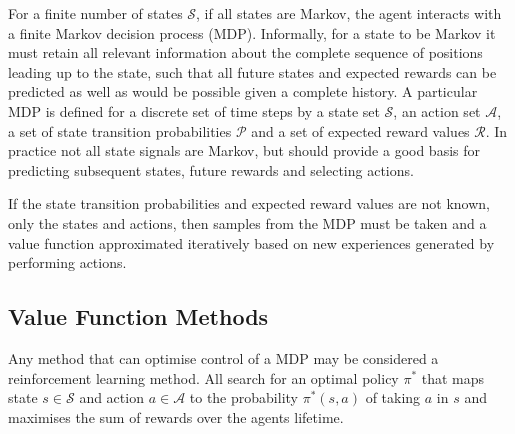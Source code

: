 %

For a finite number of states $\mathscr{S}$, if all states are Markov, the
agent interacts with a finite Markov decision process (MDP).  Informally,
for a state to be Markov it must retain all relevant information about the
complete sequence of positions leading up to the state, such that all future
states and expected rewards can be predicted as well as would be possible given
a complete history.  A particular MDP is defined for a discrete set of time
steps by a state set $\mathscr{S}$, an action set $\mathscr{A}$, a set of state
transition probabilities $\mathscr{P}$ and a set of expected reward values
$\mathscr{R}$.
In practice not all state signals are Markov, but should provide a good basis
for predicting subsequent states, future rewards and selecting actions.

If the state transition probabilities and expected reward values are not known,
only the states and actions, then samples from the MDP must be taken and a value
function approximated iteratively based on new experiences generated by
performing actions.

\subsection{Value Function Methods}
\label{sec:valuebased}
Any method that can optimise control of a MDP may be considered a reinforcement
learning method.  All search for an optimal policy $\pi^*$ that maps state
$s \in \mathscr{S}$ and action $a \in \mathscr{A}$ to the probability
$\pi^*(s,a)$ of taking $a$ in $s$ and maximises the sum of rewards over the
agents lifetime.

